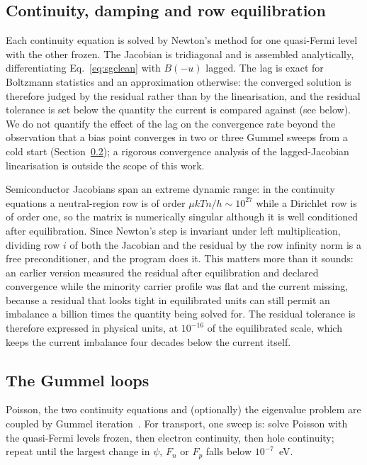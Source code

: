 \documentclass[preprint,12pt]{elsarticle}
\begin{document}
\subsection{Continuity, damping and row equilibration}
\label{sec:continuity}

Each continuity equation is solved by Newton's method for one quasi-Fermi
level with the other frozen. The Jacobian is tridiagonal and is assembled
analytically, differentiating Eq.~\eqref{eq:sgclean} with $B(-u)$ lagged. The
lag is exact for Boltzmann statistics and an approximation otherwise: the
converged solution is therefore judged by the residual rather than by the
linearisation, and the residual tolerance is set below the quantity the
current is compared against (see below). We do not quantify the effect of
the lag on the convergence rate beyond the observation that a bias point
converges in two or three Gummel sweeps from a cold start
(Section~\ref{sec:gummel}); a rigorous convergence analysis of the
lagged-Jacobian linearisation is outside the scope of this work.

Semiconductor Jacobians span an extreme dynamic range: in the continuity
equations a neutral-region row is of order $\mu kT n/h\sim10^{27}$ while a
Dirichlet row is of order one, so the matrix is numerically singular although
it is well conditioned after equilibration. Since Newton's step is invariant
under left multiplication, dividing row $i$ of both the Jacobian and the
residual by the row infinity norm is a free preconditioner, and the program
does it. This matters more than it sounds: an earlier version measured the
residual after equilibration and declared convergence while the minority
carrier profile was flat and the current missing, because a residual that
looks tight in equilibrated units can still permit an imbalance a billion times
the quantity being solved for. The residual tolerance is therefore expressed
in physical units, at $10^{-16}$ of the equilibrated scale, which keeps the
current imbalance four decades below the current itself.

\subsection{The Gummel loops}
\label{sec:gummel}

Poisson, the two continuity equations and (optionally) the eigenvalue problem
are coupled by Gummel iteration~\cite{Gummel1964}. For transport, one sweep is:
solve Poisson with the quasi-Fermi levels frozen, then electron continuity,
then hole continuity; repeat until the largest change in $\psi$, $F_n$ or
$F_p$ falls below $10^{-7}$~eV.
\end{document}
